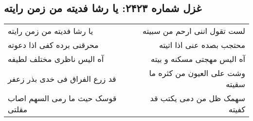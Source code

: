 \begin{center}
\section*{غزل شماره ۲۴۲۳: یا رشا فدیته من زمن رایته}
\label{sec:2423}
\begin{longtable}{l p{0.5cm} r}
یا رشا فدیته من زمن رایته
&&
لست تقول اننی ارحم من سبیته
\\
محرقنی برده کفی اذا دعوته
&&
محتجب بصده عنی اذا اتیته
\\
آه الیس ناظری مختلف لطیفه
&&
آه الیس مهجتی مسکنه و بیته
\\
قد زرع الفراق فی خدی بذر زعفر
&&
وشت علی العیون من کثره ما سقیته
\\
قوسک حیث ما رمی السهم اصاب مقلتی
&&
سهمک ظل من دمی یکتب قد کفیته
\\
\end{longtable}
\end{center}
